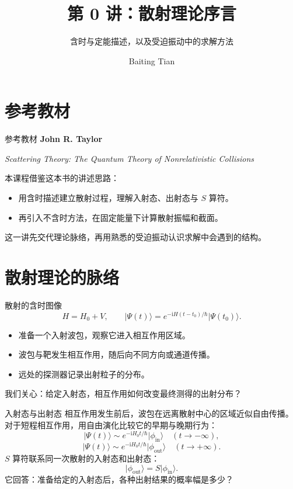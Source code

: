 \documentclass[aspectratio=169,11pt]{beamer}
\title{第 0 讲：散射理论序言}
\subtitle{含时与定能描述，以及受迫振动中的求解方法}
\author{Baiting Tian}
\date{}
\newcommand{\ii}{\mathrm i}
\newcommand{\ket}[1]{\lvert #1\rangle}
\begin{document}
\begin{frame}
\titlepage
\end{frame}

\section{参考教材}

\begin{frame}{参考教材}
\textbf{John R. Taylor}
\medskip

\textit{Scattering Theory: The Quantum Theory of Nonrelativistic Collisions}
\medskip

本课程借鉴这本书的讲述思路：
\begin{itemize}
\item 用含时描述建立散射过程，理解入射态、出射态与 $S$ 算符。
\item 再引入不含时方法，在固定能量下计算散射振幅和截面。
\end{itemize}
\medskip

这一讲先交代理论脉络，再用熟悉的受迫振动认识求解中会遇到的结构。
\end{frame}

\section{散射理论的脉络}

\begin{frame}{散射的含时图像}
\[
H=H_0+V,\qquad
\ket{\Psi(t)}=e^{-\ii H(t-t_0)/\hbar}\ket{\Psi(t_0)}.
\]
\begin{itemize}
\item 准备一个入射波包，观察它进入相互作用区域。
\item 波包与靶发生相互作用，随后向不同方向或通道传播。
\item 远处的探测器记录出射粒子的分布。
\end{itemize}
我们关心：给定入射态，相互作用如何改变最终测得的出射分布？
\end{frame}

\begin{frame}{入射态与出射态}
相互作用发生前后，波包在远离散射中心的区域近似自由传播。
对于短程相互作用，用自由演化比较它的早期与晚期行为：
\[
\ket{\Psi(t)}\sim e^{-\ii H_0t/\hbar}\ket{\phi_{\mathrm{in}}}
\quad(t\to-\infty),
\]
\[
\ket{\Psi(t)}\sim e^{-\ii H_0t/\hbar}\ket{\phi_{\mathrm{out}}}
\quad(t\to+\infty).
\]
$S$ 算符联系同一次散射的入射态和出射态：
\[
\ket{\phi_{\mathrm{out}}}=S\ket{\phi_{\mathrm{in}}}.
\]
它回答：准备给定的入射态后，各种出射结果的概率幅是多少？
\end{frame}
\end{document}
